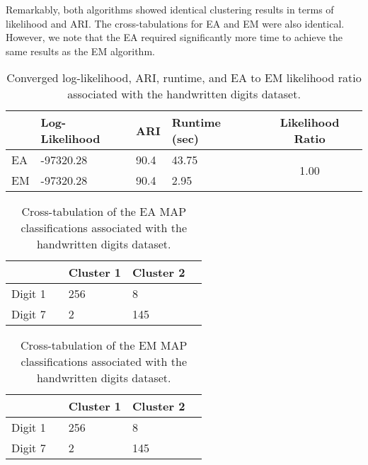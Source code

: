 \documentclass[12pt]{report}
\begin{document}
Remarkably, both algorithms showed identical clustering results in terms of likelihood and ARI. The cross-tabulations for EA and EM were also identical. However, we note that the EA required significantly more time to achieve the same results as the EM algorithm.



\begin{table}[!htbp]
  \caption{Converged log-likelihood, ARI, runtime, and EA to EM likelihood ratio associated with the handwritten digits dataset.}
    \vspace{0.5cm}
  \begin{tabularx}{\textwidth}{l *{3}{X}c}
  \toprule
    &\textbf{Log-Likelihood}& \textbf{ARI} & \textbf{Runtime (sec)} & \textbf{Likelihood Ratio} \\
  \midrule
  EA & -97320.28     & 90.4 &  43.75 & \multirow{2}{*}{1.00}  \\
  EM & -97320.28    & 90.4 & 2.95  \\
  \bottomrule
  \end{tabularx}
\end{table}


\begin{table}[!htbp]
  \caption{Cross-tabulation of the EA MAP classifications associated with the handwritten digits dataset.}
    \vspace{0.5cm}
  \begin{tabularx}{\textwidth}{l *{4}{X}}
  \toprule
   && \textbf{Cluster 1}  & \textbf{Cluster 2}  \\
  \midrule
  Digit 1 && 256 & 8 \\
  Digit 7 && 2 &  145 \\
  \bottomrule
  \end{tabularx}
\end{table}

\begin{table}[!ht]
  \caption{Cross-tabulation of the EM MAP classifications associated with the handwritten digits dataset.}
    \vspace{0.5cm}
  \begin{tabularx}{\textwidth}{l *{4}{X}}
  \toprule
   && \textbf{Cluster 1}  & \textbf{Cluster 2} \\
  \midrule
  Digit 1 && 256 & 8 \\
  Digit 7 && 2 &  145 \\
  \bottomrule
  \end{tabularx}
\end{table}
\end{document}
